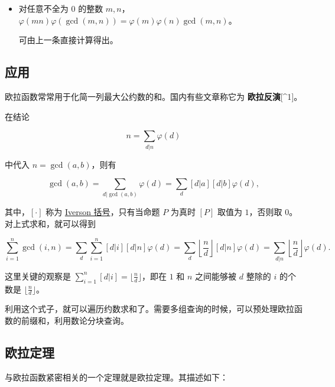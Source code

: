 \begin{itemize}
  \[
  \begin{aligned}
      \varphi(n) &= \prod_{i=1}^{s} \varphi(p_i^{k_i}) \\
      &= \prod_{i=1}^{s} (p_i-1)\times {p_i}^{k_i-1}\\
      &=\prod_{i=1}^{s} {p_i}^{k_i} \times(1 - \frac{1}{p_i})\\
      &=n~ \prod_{i=1}^{s} (1- \frac{1}{p_i})
      &\square
  \end{aligned}
  \]
\item
  对任意不全为 \(0\) 的整数 \(m,n\)，\(\varphi(mn)\varphi(\gcd(m,n))=\varphi(m)\varphi(n)\gcd(m,n)\)。

  可由上一条直接计算得出。
\end{itemize}

\subsection{应用}\label{ux5e94ux7528}

欧拉函数常常用于化简一列最大公约数的和。国内有些文章称它为 \textbf{欧拉反演}{[}\^{}1{]}。

在结论

\[
n=\sum_{d|n}\varphi(d)
\]

中代入 \(n=\gcd(a,b)\)，则有

\[
\gcd(a,b) = \sum_{d|\gcd(a,b)}\varphi(d) = \sum_d [d|a][d|b]\varphi(d),
\]

其中，\([\cdot]\) 称为 \href{https://mathworld.wolfram.com/IversonBracket.html}{Iverson 括号}，只有当命题 \(P\) 为真时 \([P]\) 取值为 \(1\)，否则取 \(0\)。对上式求和，就可以得到

\[
\sum_{i=1}^n\gcd(i,n)=\sum_{d}\sum_{i=1}^n[d|i][d|n]\varphi(d)=\sum_d\left\lfloor\frac{n}{d}\right\rfloor[d|n]\varphi(d)=\sum_{d|n}\left\lfloor\frac{n}{d}\right\rfloor\varphi(d).
\]

这里关键的观察是 \(\sum_{i=1}^n[d|i]=\lfloor\frac{n}{d}\rfloor\)，即在 \(1\) 和 \(n\) 之间能够被 \(d\) 整除的 \(i\) 的个数是 \(\lfloor\frac{n}{d}\rfloor\)。

利用这个式子，就可以遍历约数求和了。需要多组查询的时候，可以预处理欧拉函数的前缀和，利用数论分块查询。

\subsection{欧拉定理}\label{ux6b27ux62c9ux5b9aux7406}

与欧拉函数紧密相关的一个定理就是欧拉定理。其描述如下：

